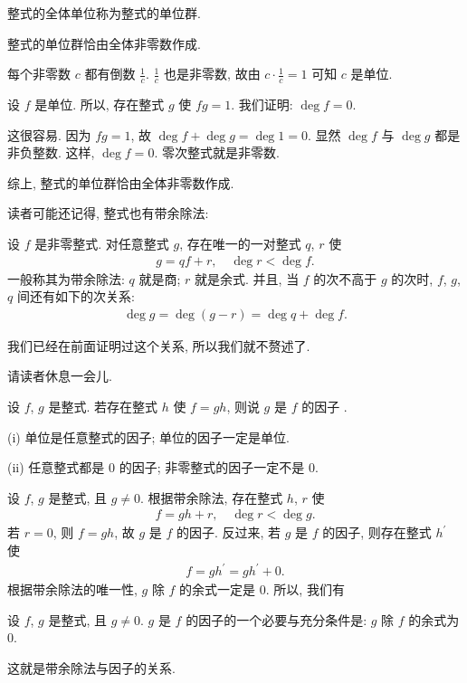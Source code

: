 \begin{definition}
    整式的全体单位称为整式的单位群.
\end{definition}

\begin{proposition}
    整式的单位群恰由全体非零数作成.
\end{proposition}

\begin{pf}
    每个非零数 $c$ 都有倒数 $\frac{1}{c}$. $\frac{1}{c}$ 也是非零数, 故由 $c \cdot \frac{1}{c} = 1$ 可知 $c$ 是单位.

    设 $f$ 是单位. 所以, 存在整式 $g$ 使 $fg = 1$. 我们证明: $\deg f = 0$.

    这很容易. 因为 $fg = 1$, 故 $\deg f + \deg g = \deg 1 = 0$. 显然 $\deg f$ 与 $\deg g$ 都是非负整数. 这样, $\deg f = 0$. 零次整式就是非零数.

    综上, 整式的单位群恰由全体非零数作成.
\end{pf}

读者可能还记得, 整式也有带余除法:

\begin{proposition}
    设 $f$ 是非零整式. 对任意整式 $g$, 存在唯一的一对整式 $q$, $r$ 使
    \begin{align*}
        g = q f + r, \quad \deg r < \deg f.
    \end{align*}
    一般称其为带余除法: $q$ 就是商; $r$ 就是余式. 并且, 当 $f$ 的次不高于 $g$ 的次时, $f$, $g$, $q$ 间还有如下的次关系:
    \begin{align*}
        \deg g = \deg {(g - r)} = \deg q + \deg f.
    \end{align*}
\end{proposition}

我们已经在前面证明过这个关系, 所以我们就不赘述了.

请读者休息一会儿.

\myLine

\begin{definition}
    设 $f$, $g$ 是整式. 若存在整式 $h$ 使 $f=gh$, 则说 $g$ 是 $f$ 的因子 .
\end{definition}

\begin{example}
    (i) 单位是任意整式的因子; 单位的因子一定是单位.

    (ii) 任意整式都是 $0$ 的因子; 非零整式的因子一定不是 $0$.
\end{example}

设 $f$, $g$ 是整式, 且 $g \neq 0$. 根据带余除法, 存在整式 $h$, $r$ 使
\begin{align*}
    f = gh + r, \quad \deg r < \deg g.
\end{align*}
若 $r = 0$, 则 $f = gh$, 故 $g$ 是 $f$ 的因子. 反过来, 若 $g$ 是 $f$ 的因子, 则存在整式 $h^{\prime}$ 使
\begin{align*}
    f = gh^{\prime} = gh^{\prime} + 0.
\end{align*}
根据带余除法的唯一性, $g$ 除 $f$ 的余式一定是 $0$. 所以, 我们有
\begin{proposition}
    设 $f$, $g$ 是整式, 且 $g \neq 0$. $g$ 是 $f$ 的因子的一个必要与充分条件是: $g$ 除 $f$ 的余式为 $0$.
\end{proposition}
这就是带余除法与因子的关系.

